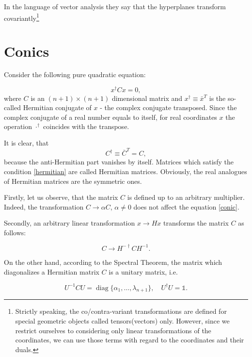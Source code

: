 \documentclass[a4paper,10pt]{article}
\newcommand{\diag}{\mathop{\mathrm{diag}}}
\begin{document}
In the language of vector analysis they say that the hyperplanes transform covariantly\footnote{ Strictly speaking, the co/contra-variant transformations are defined for special geometric objects called tensors(vectors) only. However, since we restrict ourselves to considering only linear transformations of the coordinates, we can use those terms with regard to the coordinates and their duals. }

\section{Conics}

Consider the following  pure quadratic equation:

\begin{equation}
 x^\dag C x = 0,\label{conic}
\end{equation}
where  $C$ is an $(n+1) \times (n+1)$ dimensional matrix and $x^\dag \equiv {\bar x}^T$ is the so-called Hermitian conjugate of $x$ - the complex conjugate transposed. Since the complex conjugate of a real number equals to itself,  for real coordinates $x$ the operation $\cdot^\dag$ coincides with the transpose. 

It is clear, that 
\begin{equation}
 C^\dag\equiv {\bar C}^T= C,\label{hermitian}
\end{equation}
because the anti-Hermitian part vanishes by itself.  Matrices which satisfy the condition \eqref{hermitian} are called Hermitian matrices. Obviously, the real analogues of Hermitian matrices are the symmetric ones.

Firstly, let us observe, that the matrix $C$ is defined up to an arbitrary multiplier. Indeed, the transformation $C\to \alpha C$, $\alpha\neq 0$ does not affect the equation \eqref{conic}.

Secondly, an arbitrary linear transformation $x \to H x$ transforms the matrix $C$ as follows:

\begin{equation}
 C \to H^{-\dag} C H^{-1}.\label{ctrans}
\end{equation}

On the other hand, according to the Spectral Theorem, the matrix which diagonalizes a Hermitian matrix $C$ is a unitary matrix, i.e. 

\begin{equation}
 U^{-1} C U = \diag\{\alpha_1,\ldots, \lambda_{n+1}\},\quad  U^\dag U = \mathbb{1}.
\end{equation}
\end{document}
